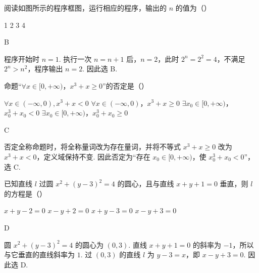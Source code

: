 \begin{problem}
阅读如图所示的程序框图，运行相应的程序，输出的 \(n\) 的值为（\quad）


\choices
    {1}
    {2}
    {3}
    {4}

\begin{answer}
B
\end{answer}

\begin{solution}
程序开始时 \(n=1\). 执行一次 \(n=n+1\) 后，\(n=2\)，此时 \(2^n=2^2=4\)，不满足 \(2^n>n^2\)，程序输出 \(n=2\). 因此选 B.
\end{solution}
\end{problem}

\begin{problem}
命题“\(\forall x \in [0, +\infty)\)，\(x^3 + x \geqslant 0\)”的否定是（\quad）

\choices
    {\(\forall x \in (-\infty, 0), x^3 + x < 0\)}
    {\(\forall x \in (-\infty, 0)\)，\(x^3 + x \geqslant 0\)}
    {\(\exists x_0 \in [0, +\infty)\)，\(x_0^3 + x_0 < 0\)}
    {\(\exists x_0 \in [0, +\infty)\)，\(x_0^3 + x_0 \geqslant 0\)}

\begin{answer}
C
\end{answer}

\begin{solution}
否定全称命题时，将全称量词改为存在量词，并将不等式 \(x^3+x\geqslant 0\) 改为 \(x^3+x<0\)，定义域保持不变. 因此否定为“存在 \(x_0\in[0,+\infty)\)，使 \(x_0^3+x_0<0\)”，选 C.
\end{solution}
\end{problem}

\begin{problem}
已知直线 \(l\) 过圆 \(x^{2} + (y - 3)^{2} = 4\) 的圆心，且与直线 \(x + y + 1 = 0\) 垂直，则 \(l\) 的方程是（\quad）

\choices
    {\(x + y - 2 = 0\)}
    {\(x - y + 2 = 0\)}
    {\(x + y - 3 = 0\)}
    {\(x - y + 3 = 0\)}

\begin{answer}
D
\end{answer}

\begin{solution}
圆 \(x^2+(y-3)^2=4\) 的圆心为 \((0,3)\). 直线 \(x+y+1=0\) 的斜率为 \(-1\)，所以与它垂直的直线斜率为 \(1\). 过 \((0,3)\) 的直线 \(l\) 为 \(y-3=x\)，即 \(x-y+3=0\). 因此选 D.
\end{solution}
\end{problem}

